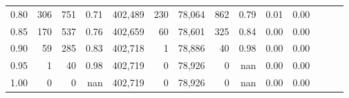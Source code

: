 \begin{tabular}{rrrrrrrrrrrrrr}
0.80 &      306 &     751 &  0.71 &  402,489 &      230 &  78,064 &     862 &  0.79 &  0.01 &      0.00 \\
0.85 &      170 &     537 &  0.76 &  402,659 &       60 &  78,601 &     325 &  0.84 &  0.00 &      0.00 \\
0.90 &       59 &     285 &  0.83 &  402,718 &        1 &  78,886 &      40 &  0.98 &  0.00 &      0.00 \\
0.95 &        1 &      40 &  0.98 &  402,719 &        0 &  78,926 &       0 &   nan &  0.00 &      0.00 \\
1.00 &        0 &       0 &   nan &  402,719 &        0 &  78,926 &       0 &   nan &  0.00 &      0.00 \\
\bottomrule
\end{tabular}
